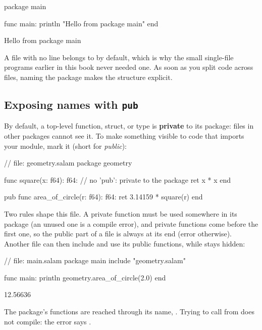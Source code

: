 \begin{salamen}
package main

func main:
    println "Hello from package main"
end
\end{salamen}

\begin{progout}
Hello from package main
\end{progout}

A file with no  line belongs to  by default, which is
why the small single-file programs earlier in this book never needed one. As soon
as you split code across files, naming the package makes the structure explicit.

\subsection{Exposing names with \texttt{pub}}

By default, a top-level function, struct, or type is \textbf{private} to its
package: files in other packages cannot see it. To make something visible to code that imports
your module, mark it  (short for \emph{public}):

\begin{salamen}
// file: geometry.salam
package geometry

func square(x: f64): f64:          // no 'pub': private to the package
    ret x * x
end

pub func area_of_circle(r: f64): f64:
    ret 3.14159 * square(r)
end
\end{salamen}

Two rules shape this file. A private function must be used somewhere in its
package (an unused one is a compile error), and private functions come before the
first  one, so the public part of a file is always at its end
(error  otherwise). Another file can then include
 and use its public functions, while  stays
hidden:

\begin{salamen}
// file: main.salam
package main
include "geometry.salam"

func main:
    println geometry.area_of_circle(2.0)
end
\end{salamen}

\begin{progout}
12.56636
\end{progout}

The package's functions are reached through its name, . Trying
to call  from  does not compile:
the error says .

